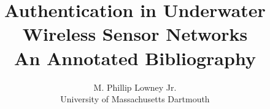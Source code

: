 \documentclass [11pt]{article}
\title{Authentication in Underwater Wireless Sensor Networks\\\medskip An Annotated Bibliography}
\author{M. Phillip Lowney Jr.\\University of Massachusetts Dartmouth}
\begin{document}
\maketitle
\nocite{*}


\end{document}

